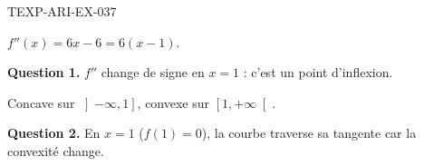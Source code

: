 \begin{corrige}{TEXP-ARI-EX-037}

$f''(x) = 6x - 6 = 6(x-1)$.


\textbf{Question 1.} $f''$ change de signe en $x = 1$ : c'est un point d'inflexion.

Concave sur $\left]-\infty, 1\right]$, convexe sur $\left[1, +\infty\right[$.

\textbf{Question 2.} En $x = 1$ ($f(1) = 0$), la courbe traverse sa tangente car la convexité change.

\end{corrige}
